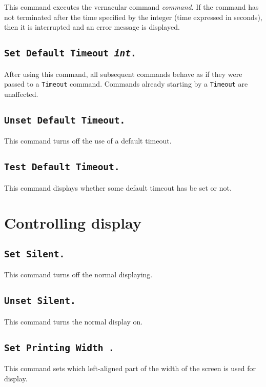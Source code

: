 This command executes the vernacular command \textrm{\textsl{command}}. If
the command has not terminated after the time specified by the integer
(time expressed in seconds), then it is interrupted and an error message
is displayed.

\subsection[\tt Set Default Timeout \textrm{\textsl{int}}.]{\tt Set
  Default Timeout \textrm{\textsl{int}}.}

After using this command, all subsequent commands behave as if they
were passed to a {\tt Timeout} command. Commands already starting by
a {\tt Timeout} are unaffected.

\subsection[\tt Unset Default Timeout.]{\tt Unset Default Timeout.}

This command turns off the use of a default timeout.

\subsection[\tt Test Default Timeout.]{\tt Test Default Timeout.}

This command displays whether some default timeout has be set or not.

\section{Controlling display}

\subsection[\tt Set Silent.]{\tt Set Silent.
\label{Begin-Silent}
}
This command turns off the normal displaying.

\subsection[\tt Unset Silent.]{\tt Unset Silent.}
This command turns the normal display on.

\subsection[\tt Set Printing Width {\integer}.]{\tt Set Printing Width {\integer}.}
\label{SetPrintingWidth}
This command sets which left-aligned part of the width of the screen
is used for display. 

